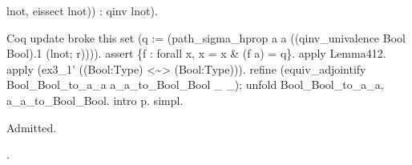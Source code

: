 \begin{coqdoccode}
\begin{coqdoccomment}
lnot,\coqdocindent{0.50em}
eissect\coqdocindent{0.50em}
lnot))\coqdocindent{0.50em}
:\coqdocindent{0.50em}
qinv\coqdocindent{0.50em}
lnot).\coqdoceol
\coqdocindent{1.00em}
\begin{coqdoccomment}
\coqdocindent{0.50em}
Coq\coqdocindent{0.50em}
update\coqdocindent{0.50em}
broke\coqdocindent{0.50em}
this\coqdoceol
\coqdocindent{1.00em}
set\coqdocindent{0.50em}
(q\coqdocindent{0.50em}
:=\coqdocindent{0.50em}
(path\_sigma\_hprop\coqdocindent{0.50em}
a\coqdocindent{0.50em}
a\coqdocindent{0.50em}
((qinv\_univalence\coqdocindent{0.50em}
Bool\coqdocindent{0.50em}
Bool).1\coqdocindent{0.50em}
(lnot;\coqdocindent{0.50em}
r)))).\coqdoceol
\coqdocindent{1.00em}
assert\coqdocindent{0.50em}
\{f\coqdocindent{0.50em}
:\coqdocindent{0.50em}
forall\coqdocindent{0.50em}
x,\coqdocindent{0.50em}
x\coqdocindent{0.50em}
=\coqdocindent{0.50em}
x\coqdocindent{0.50em}
\&\coqdocindent{0.50em}
(f\coqdocindent{0.50em}
a)\coqdocindent{0.50em}
=\coqdocindent{0.50em}
q\}.\coqdoceol
\coqdocindent{1.00em}
apply\coqdocindent{0.50em}
Lemma412.\coqdoceol
\coqdocindent{1.00em}
apply\coqdocindent{0.50em}
(ex3\_1'\coqdocindent{0.50em}
((Bool:Type)\coqdocindent{0.50em}
<\~{}>\coqdocindent{0.50em}
(Bool:Type))).\coqdoceol
\coqdocindent{1.00em}
refine\coqdocindent{0.50em}
(equiv\_adjointify\coqdocindent{0.50em}
Bool\_Bool\_to\_a\_a\coqdocindent{0.50em}
a\_a\_to\_Bool\_Bool\coqdocindent{0.50em}
\_\coqdocindent{0.50em}
\_);\coqdoceol
\coqdocindent{1.00em}
unfold\coqdocindent{0.50em}
Bool\_Bool\_to\_a\_a,\coqdocindent{0.50em}
a\_a\_to\_Bool\_Bool.\coqdoceol
\coqdocindent{1.00em}
intro\coqdocindent{0.50em}
p.\coqdocindent{0.50em}
simpl.\coqdoceol
\coqdocindent{1.50em}
\end{coqdoccomment}
\coqdoceol
Admitted.\coqdoceol
\end{coqdoccomment}
\coqdoceol
\coqdocemptyline
\coqdocnoindent
{} .\coqdoceol
\end{coqdoccode}
